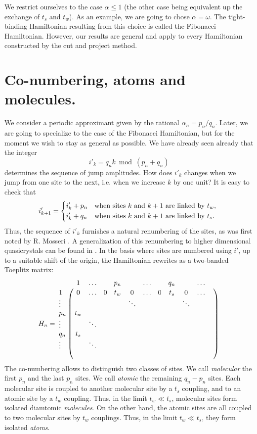 \documentclass[11pt]{article}
\begin{document}
We restrict ourselves to the case $\alpha \leq 1$ (the other case being equivalent up the exchange of $t_s$ and $t_w$). As an example, we are going to chose $\alpha = \omega$. The tight-binding Hamiltonian resulting from this choice is called the Fibonacci Hamiltonian.
However, our results are general and apply to every Hamiltonian constructed by the cut and project method.

\section{Co-numbering, atoms and molecules.}

We consider a periodic approximant given by the rational $\alpha_n = p_n/q_n$. Later, we are going to specialize to the case of the Fibonacci Hamiltonian, but for the moment we wish to stay as general as possible.
We have already seen already that the integer
\begin{equation}
	i'_k = q_n k \bmod(p_n+q_n)
\end{equation}
determines the sequence of jump amplitudes. How does $i'_k$ changes when we jump from one site to the next, i.e. when we increase $k$ by one unit? It is easy to check that
\begin{equation}
	i'_{k+1} = \begin{dcases*}
	i'_k + p_n & when sites $k$ and $k+1$ are linked by $t_w$, \\
	i'_k + q_n & when sites $k$ and $k+1$ are linked by $t_s$.
	\end{dcases*}
\end{equation}
Thus, the sequence of $i'_k$ furnishes a natural renumbering of the sites, as was first noted by R. Mosseri \cite{Moss}. A generalization of this renumbering to higher dimensional quasicrystals can be found in \cite{MossSire}.
In the basis where sites are numbered using $i'$, up to a suitable shift of the origin, the Hamiltonian rewrites as a two-banded Toeplitz matrix:
\begin{equation}
	H_n = 
	\bordermatrix{ 
	 	& 1 	&	\ldots & & p_n	& &  \ldots &	& q_n &	& \ldots	&  \cr
    1 	& 0 		& \ldots & 0 & t_w & 0	& \ldots & 0 & t_s	& 0 		& \ldots		 \cr
    \vdots & & & & & \ddots	& & & & \ddots & \cr
    p_n & t_w \cr
    \vdots & & \ddots \cr
    q_n & t_s \cr
    \vdots & & \ddots \cr
     & 
    }
\end{equation}
The co-numbering allows to distinguish two classes of sites. We call \emph{molecular} the first $p_n$ and the last $p_n$ sites. We call \emph{atomic} the remaining $q_n - p_n$ sites.
Each molecular site is coupled to another molecular site by a $t_s$ coupling, and to an atomic site by a $t_w$ coupling. Thus, in the limit $t_w \ll t_s$, molecular sites form isolated diamtomic \emph{molecules}. 
On the other hand, the atomic sites are all coupled to two molecular sites by $t_w$ couplings. Thus, in the limit $t_w \ll t_s$, they form isolated \emph{atoms}.
\end{document}
